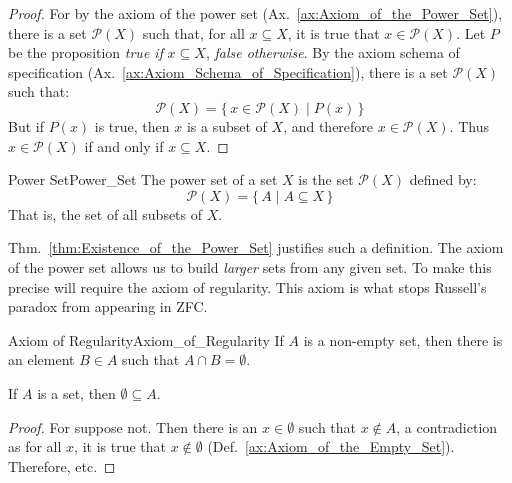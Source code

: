         \begin{proof}
            For by the axiom of the power set
            (Ax.~\ref{ax:Axiom_of_the_Power_Set}), there is a set
            $\mathscr{P}(X)$ such that, for all $x\subseteq{X}$, it is true
            that $x\in\mathscr{P}(X)$. Let $P$ be the proposition
            \textit{true if} $x\subseteq{X}$, \textit{false otherwise}. By the
            axiom schema of specification
            (Ax.~\ref{ax:Axiom_Schema_of_Specification}), there is a set
            $\mathcal{P}(X)$ such that:
            \begin{equation}
                \mathcal{P}(X)=\{\,x\in\mathscr{P}(X)\;|\;P(x)\,\}
            \end{equation}
            But if $P(x)$ is true, then $x$ is a subset of $X$, and therefore
            $x\in\mathscr{P}(X)$. Thus $x\in\mathcal{P}(X)$ if and only if
            $x\subseteq{X}$.
        \end{proof}
        \begin{fdefinition}{Power Set}{Power_Set}
            The power set of a set $X$ is the set $\mathcal{P}(X)$ defined by:
            \begin{equation}
                \mathcal{P}(X)=\{\,A\;|\;A\subseteq{X}\,\}
            \end{equation}
            That is, the set of all subsets of $X$.
        \end{fdefinition}
        Thm.~\ref{thm:Existence_of_the_Power_Set} justifies such a definition.
        The axiom of the power set allows us to build \textit{larger} sets from
        any given set. To make this precise will require the axiom of
        regularity. This axiom is what stops Russell's paradox from appearing
        in ZFC.
        \begin{faxiom}{Axiom of Regularity}{Axiom_of_Regularity}
            If $A$ is a non-empty set, then there is an element $B\in{A}$
            such that $A\cap{B}=\emptyset$.
        \end{faxiom}
        \begin{theorem}
            \label{thm:Emptyset_Is_Subset}%
            If $A$ is a set, then $\emptyset\subseteq{A}$.
        \end{theorem}
        \begin{proof}
            For suppose not. Then there is an $x\in\emptyset$ such that
            $x\notin{A}$, a contradiction as for all $x$, it is true that
            $x\notin\emptyset$ (Def.~\ref{ax:Axiom_of_the_Empty_Set}).
            Therefore, etc.
        \end{proof}
